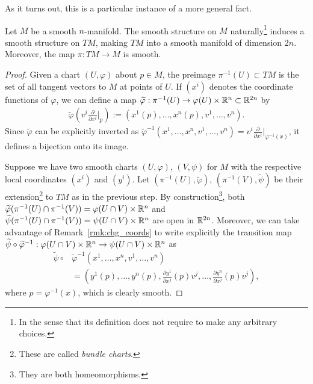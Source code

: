 As it turns out, this is a particular instance of a more general fact.

\begin{theorem}\label{thm:tgbdlsmoothmfld}
	Let $M$ be a smooth $n$-manifold.
	The smooth structure on $M$ naturally\footnote{In the sense that its definition does not require to make any arbitrary choices.} induces a smooth structure on $TM$, making $TM$ into a smooth manifold of dimension $2n$.
	Moreover, the map $\pi: TM \to M$ is smooth.
\end{theorem}
\begin{proof}
	Given a chart $(U,\varphi)$ about $p\in M$, the preimage $\pi^{-1}(U) \subset TM$ is the set of all tangent vectors to $M$ at points of $U$.
	If $(x^i)$ denotes the coordinate functions of $\varphi$, we can define a map $\widetilde\varphi : \pi^{-1}(U) \to \varphi(U)\times\mathbb{R}^n \subset \mathbb{R}^{2n}$ by
	\begin{align}\label{eq:nat_coords}
		\widetilde\varphi\left(v^i \frac{\partial}{\partial x^i}\Big|_p\right) := \left(x^1(p), \ldots, x^n(p), v^1, \ldots, v^n\right).
	\end{align}
	Since $\widetilde\varphi$ can be explicitly inverted as $\widetilde\varphi^{-1}\left(x^1, \ldots, x^n, v^1, \ldots, v^n\right) = v^i \frac{\partial}{\partial x^i}\Big|_{\varphi^{-1}(x)}$, it defines a bijection onto its image.

	Suppose we have two smooth charts $(U,\varphi)$, $(V,\psi)$ for $M$ with the respective local coordinates $(x^i)$ and $(y^i)$.
	Let $(\pi^{-1}(U),\widetilde\varphi)$, $(\pi^{-1}(V),\widetilde\psi)$ be their extension\footnote{These are called \emph{bundle charts}.} to $TM$ as in the previous step.
	By construction\footnote{They are both homeomorphisms.}, both $\widetilde\varphi(\pi^{-1}(U)\cap\pi^{-1}(V)) = \varphi(U\cap V)\times\mathbb{R}^n$ and $\widetilde\psi(\pi^{-1}(U)\cap\pi^{-1}(V)) = \psi(U\cap V)\times\mathbb{R}^n$ are open in $\mathbb{R}^{2n}$.
	Moreover, we can take advantage of Remark~\ref{rmk:chg_coords} to write explicitly the transition map  $\widetilde\psi\circ\widetilde\varphi^{-1}: \varphi(U\cap V)\times\mathbb{R}^n \to \psi(U\cap V)\times\mathbb{R}^n$ as
	\begin{align}
		\widetilde\psi\circ & \widetilde\varphi^{-1}\left(x^1, \ldots, x^n, v^1, \ldots, v^n\right)                                                            \\
		                    & =\left(y^1(p),\ldots, y^n(p), \frac{\partial y^1}{\partial x^j}(p) v^j, \ldots, \frac{\partial y^n}{\partial x^j}(p) v^j\right),
	\end{align}
	where $p = \varphi^{-1}(x)$, which is clearly smooth.


\end{proof}
